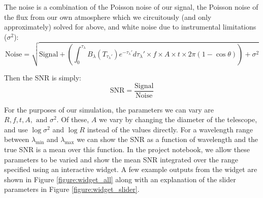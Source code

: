 \documentclass{knac}
\begin{document}
The noise is a combination of the Poisson noise of our signal, the Poisson noise of the flux from our own atmosphere which we circuitously (and only approximately) solved for above, and white noise due to instrumental limitations ($\sigma^2$):
\begin{equation}
 \mathrm{Noise} = \sqrt{\mathrm{Signal} + \left(\int_{0}^{\tau_{\lambda}} B_{\lambda} (T_{\tau_{\lambda}'})e^{-\tau_{\lambda}'}d\tau_{\lambda}' \times f \times A \times t\times 2\pi\left(1 - \cos{\theta}\right)\right) + \sigma^2}   
\end{equation}

Then the SNR is simply:
\begin{equation}
    \mathrm{SNR} = \frac{\mathrm{Signal}}{\mathrm{Noise}}
\end{equation}

For the purposes of our simulation, the parameters we can vary are $R, f, t, A, \text{ and }\sigma^2$. Of these, $A$ we vary by changing the diameter of the telescope, and use $\log{\sigma^2}$ and $\log{R}$ instead of the values directly. For a wavelength range between $\lambda_\mathrm{min}$ and $\lambda_\mathrm{max}$ we can show the SNR as a function of wavelength and the true SNR is a mean over this function. In the project notebook, we allow these parameters to be varied and show the mean SNR integrated over the range specified using an interactive widget. A few example outputs from the widget are shown in Figure \ref{figure:widget_all} along with an explanation of the slider parameters in Figure \ref{figure:widget_slider}.
\end{document}
